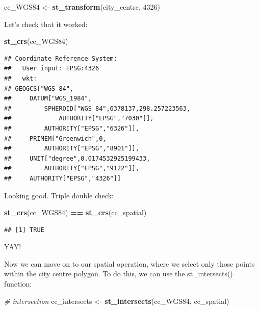 \documentclass[]{book}
\newenvironment{Shaded}{\begin{snugshade}}{\end{snugshade}}
\newcommand{\CommentTok}[1]{\textcolor[rgb]{0.56,0.35,0.01}{\textit{#1}}}
\newcommand{\DecValTok}[1]{\textcolor[rgb]{0.00,0.00,0.81}{#1}}
\newcommand{\KeywordTok}[1]{\textcolor[rgb]{0.13,0.29,0.53}{\textbf{#1}}}
\newcommand{\NormalTok}[1]{#1}
\newcommand{\OperatorTok}[1]{\textcolor[rgb]{0.81,0.36,0.00}{\textbf{#1}}}
\newcommand{\StringTok}[1]{\textcolor[rgb]{0.31,0.60,0.02}{#1}}
\begin{document}
\begin{Shaded}
\begin{Highlighting}[]
\NormalTok{cc_WGS84 <-}\StringTok{ }\KeywordTok{st_transform}\NormalTok{(city_centre, }\DecValTok{4326}\NormalTok{)}
\end{Highlighting}
\end{Shaded}

Let's check that it worked:

\begin{Shaded}
\begin{Highlighting}[]
\KeywordTok{st_crs}\NormalTok{(cc_WGS84) }
\end{Highlighting}
\end{Shaded}

\begin{verbatim}
## Coordinate Reference System:
##   User input: EPSG:4326 
##   wkt:
## GEOGCS["WGS 84",
##     DATUM["WGS_1984",
##         SPHEROID["WGS 84",6378137,298.257223563,
##             AUTHORITY["EPSG","7030"]],
##         AUTHORITY["EPSG","6326"]],
##     PRIMEM["Greenwich",0,
##         AUTHORITY["EPSG","8901"]],
##     UNIT["degree",0.0174532925199433,
##         AUTHORITY["EPSG","9122"]],
##     AUTHORITY["EPSG","4326"]]
\end{verbatim}

Looking good. Triple double check:

\begin{Shaded}
\begin{Highlighting}[]
\KeywordTok{st_crs}\NormalTok{(cc_WGS84) }\OperatorTok{==}\StringTok{ }\KeywordTok{st_crs}\NormalTok{(cc_spatial)}
\end{Highlighting}
\end{Shaded}

\begin{verbatim}
## [1] TRUE
\end{verbatim}

YAY!

Now we can move on to our spatial operation, where we select only those points within the city centre polygon. To do this, we can use the st\_intersects() function:

\begin{Shaded}
\begin{Highlighting}[]
\CommentTok{# intersection}
\NormalTok{cc_intersects <-}\StringTok{ }\KeywordTok{st_intersects}\NormalTok{(cc_WGS84, cc_spatial)}
\end{Highlighting}
\end{Shaded}
\end{document}
